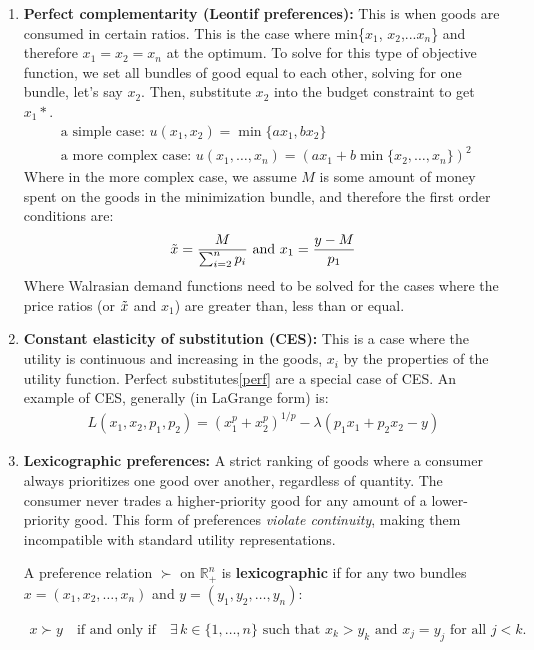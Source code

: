 \documentclass{article}
\begin{document}
\begin{enumerate}
    \item \textbf{Perfect complementarity (Leontif preferences):} This is when goods are consumed in certain ratios. This is the case where min\{$x_1$, $x_2$,...$x_n$\} and therefore $x_1 = x_2 = x_n$ at the optimum. To solve for this type of objective function, we set all bundles of good equal to each other, solving for one bundle, let's say $x_2$. Then, substitute $x_2$ into the budget constraint to get $x_1*$. 
    \begin{align}
    \text{ a simple case: } u(x_1, x_2) = \min \{ ax_1, bx_2 \} \\ 
    \text{ a more complex case: } u(x_1, \ldots, x_n) = (ax_1 + b \min \{x_2, \ldots, x_n\})^2
    \end{align}
    Where in the more complex case, we assume $M$ is some amount of money spent on the goods in the minimization bundle, and therefore the first order conditions are: 
    \[
    \Tilde{x} = \frac{M}{\sum_{i=2}^{n} p_i} \text{  and  } x_1 = \frac{y-M}{p_1} 
    \]
    Where Walrasian demand functions need to be solved for the cases where the price ratios (or $\Tilde{x}$ and $x_1$) are greater than, less than or equal. 
    \item \textbf{Constant elasticity of substitution (CES):} This is a case where the utility is continuous and increasing in the goods, $x_i$ by the properties of the utility function. Perfect substitutes\ref{perf} are a special case of CES. An example of CES, generally (in LaGrange form) is:
    \begin{align}
        L(x_1,x_2,p_1,p_2) = (x^p_1 + x^p_2)^{1/p} - \lambda (p_1x_1 + p_2x_2 - y)
    \end{align}
    \item \textbf{Lexicographic preferences:}\label{lex} A strict ranking of goods where a consumer always prioritizes one good over another, regardless of quantity. The consumer never trades a higher-priority good for any amount of a lower-priority good. This form of preferences \textit{violate continuity}, making them incompatible with standard utility representations. 
    
    A preference relation \( \succ \) on \( \mathbb{R}^n_+ \) is \textbf{lexicographic} if for any two bundles \( x = (x_1, x_2, \dots, x_n) \) and \( y = (y_1, y_2, \dots, y_n) \):

    \begin{align}
        x \succ y \quad \text{if and only if} \quad \exists \, k \in \{1, \dots, n\} \text{ such that } x_k > y_k \text{ and } x_j = y_j \text{ for all } j < k.
    \end{align}

\end{enumerate} 
\end{document}
